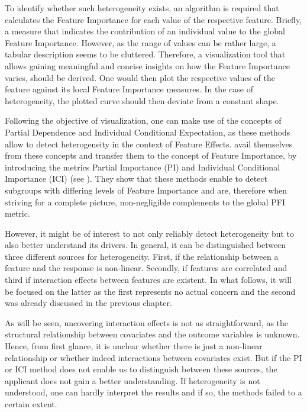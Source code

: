 \documentclass[]{krantz}
\begin{document}
To identify whether such heterogeneity exists, an algorithm is required
that calculates the Feature Importance for each value of the respective
feature. Briefly, a measure that indicates the contribution of an
individual value to the global Feature Importance. However, as the range
of values can be rather large, a tabular description seems to be
cluttered. Therefore, a visualization tool that allows gaining
meaningful and concise insights on how the Feature Importance varies,
should be derived. One would then plot the respective values of the
feature against its local Feature Importance measures. In the case of
heterogeneity, the plotted curve should then deviate from a constant
shape.

Following the objective of visualization, one can make use of the
concepts of Partial Dependence and Individual Conditional Expectation,
as these methods allow to detect heterogeneity in the context of Feature
Effects. \citet{casalicchio2018visualizing} avail themselves from these
concepts and transfer them to the concept of Feature Importance, by
introducing the metrics Partial Importance (PI) and Individual
Conditional Importance (ICI) (see \citet{Goldstein2013}). They show that
these methods enable to detect subgroups with differing levels of
Feature Importance and are, therefore when striving for a complete
picture, non-negligible complements to the global PFI metric.

However, it might be of interest to not only reliably detect
heterogeneity but to also better understand its drivers. In general, it
can be distinguished between three different sources for heterogeneity.
First, if the relationship between a feature and the response is
non-linear. Secondly, if features are correlated and third if
interaction effects between features are existent. In what follows, it
will be focused on the latter as the first represents no actual concern
and the second was already discussed in the previous chapter.

As will be seen, uncovering interaction effects is not as
straightforward, as the structural relationship between covariates and
the outcome variables is unknown. Hence, from first glance, it is
unclear whether there is just a non-linear relationship or whether
indeed interactions between covariates exist. But if the PI or ICI
method does not enable us to distinguish between these sources, the
applicant does not gain a better understanding. If heterogeneity is not
understood, one can hardly interpret the results and if so, the methods
failed to a certain extent.
\end{document}
